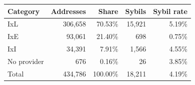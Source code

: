 \begin{tabular}{lrrrr}
\toprule
Category & Addresses & Share & Sybils & Sybil rate \\
\midrule
IxL & 306,658 & 70.53\% & 15,921 & 5.19\% \\
IxE & 93,061 & 21.40\% & 698 & 0.75\% \\
IxI & 34,391 & 7.91\% & 1,566 & 4.55\% \\
No provider & 676 & 0.16\% & 26 & 3.85\% \\
\midrule
Total & 434,786 & 100.00\% & 18,211 & 4.19\% \\
\bottomrule
\end{tabular}

